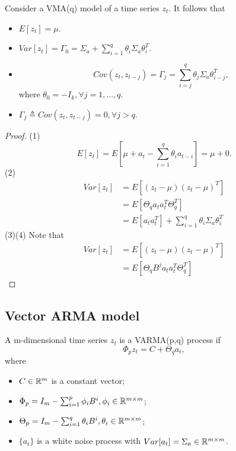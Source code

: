 \begin{lemma}\cite[110]{tsay2013multivariate}
Consider a VMA(q) model of a time series $z_t$. It follows that
\begin{itemize}
	\item $E[z_t] = \mu$.
	\item $Var[z_t] = \Gamma_0 = \Sigma_a + \sum_{i=1}^q \theta_i \Sigma_a \theta_i^T$.
	\item $$Cov(z_t, z_{t-j}) = \Gamma_j = \sum_{i=j}^q \theta_j \Sigma_a \theta_{i-j}^T,$$
	where $\theta_0 = -I_k, \forall j=1,...,q$.
	\item $\Gamma_j  \triangleq Cov(z_t, z_{t-j}) = 0, \forall j > q$.
\end{itemize}
\end{lemma}
\begin{proof}
(1) $$E[z_t] = E[\mu + a_t - \sum_{i=1}^q \theta_i a_{t-i}] = \mu +　0.$$
(2)	
\begin{align*}
Var[z_t] &= E[(z_t - \mu)(z_t - \mu)^T] \\
& =  E[\Theta_qa_t a_t^T\Theta_q^T] \\
& = E[a_t a_t^T] + \sum_{i=1}^q \theta_i \Sigma_a \theta_i^T 
\end{align*}
(3)(4) Note that
\begin{align*}
Var[z_t] &= E[(z_t - \mu)(z_t - \mu)^T] \\
& =  E[\Theta_q B^j a_t a_t^T\Theta_q^T] 
\end{align*}
\end{proof}


\subsection{Vector ARMA model}

\begin{definition}\cite[127]{tsay2013multivariate}
A m-dimensional time series $z_t$ is a VARMA(p,q) process if
$$\Phi_p z_t = C + \Theta_q a_t,$$
where
\begin{itemize}
	\item $C \in \mathbb{R}^m$ is a constant vector;
	\item $\Phi_p = I_m - \sum_{i=1}^p \phi_i B^i, \phi_i\in \mathbb{R}^{m\times m}$;
	\item $\Theta_p = I_m - \sum_{i=1}^q \theta_i B^i, \theta_i \in \mathbb{R}^{m\times m}$;
	\item $\{a_t\}$ is a white noise process with $Var[a_t] = \Sigma_a \in \mathbb{R}^{m\times m}$. 	
\end{itemize}	
\end{definition}



